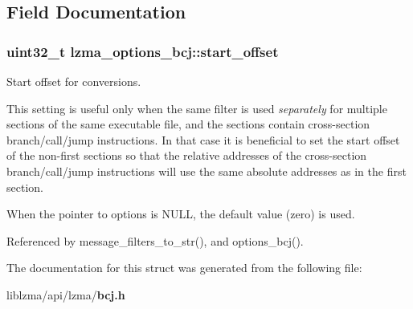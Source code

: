 \subsection{Field Documentation}
\subsubsection[{start\-\_\-offset}]{\setlength{\rightskip}{0pt plus 5cm}uint32\-\_\-t lzma\-\_\-options\-\_\-bcj\-::start\-\_\-offset}\label{structlzma__options__bcj_a3f5a3c62cd82ce89433684f12ed096ac}


Start offset for conversions. 

This setting is useful only when the same filter is used {\itshape separately} for multiple sections of the same executable file, and the sections contain cross-\/section branch/call/jump instructions. In that case it is beneficial to set the start offset of the non-\/first sections so that the relative addresses of the cross-\/section branch/call/jump instructions will use the same absolute addresses as in the first section.

When the pointer to options is N\-U\-L\-L, the default value (zero) is used. 

Referenced by message\-\_\-filters\-\_\-to\-\_\-str(), and options\-\_\-bcj().



The documentation for this struct was generated from the following file\-:\begin{DoxyCompactItemize}
\item 
liblzma/api/lzma/{\bf bcj.\-h}\end{DoxyCompactItemize}
